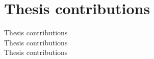 

\section{Thesis contributions}

Thesis contributions \\
Thesis contributions \\
Thesis contributions \\